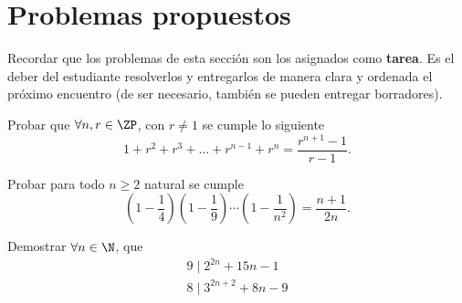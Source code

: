 \section{Problemas propuestos}

Recordar que los problemas de esta sección son los asignados como \textbf{tarea}.
Es el deber del estudiante resolverlos y entregarlos de manera clara y ordenada el próximo encuentro
(de ser necesario, también se pueden entregar borradores).

\begin{section-problem}
    Probar que $\forall n, r \in \ZP$, con $r \neq 1$ se cumple lo siguiente
    \[1 + r^2 + r^3 + \dots + r^{n-1} + r^n = \frac{r^{n + 1} - 1}{r - 1}.\]
\end{section-problem}

\begin{section-problem}
    Probar para todo $n\geq 2$ natural se cumple
    \[\left(1 - \frac{1}{4}\right) \left(1 - \frac{1}{9}\right) \cdots \left(1 - \frac{1}{n^2}\right) = \frac{n + 1}{2n}.\]
\end{section-problem}

\begin{section-problem}
    Demostrar $\forall n \in \N$, que
    \begin{gather*}
        9 \mid 2^{2n} + 15n - 1 \\
        8 \mid 3^{2n + 2} + 8n - 9
    \end{gather*}
\end{section-problem}
